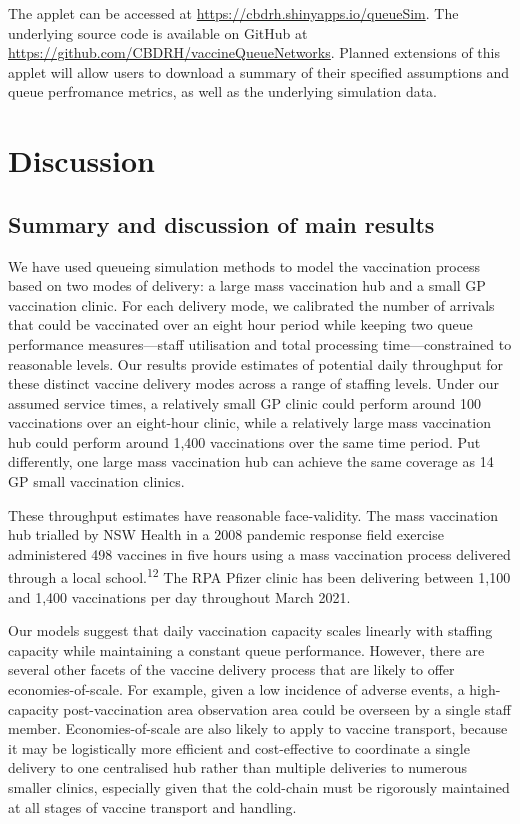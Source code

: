 \documentclass{article}
\begin{document}
The applet can be accessed at \url{https://cbdrh.shinyapps.io/queueSim}.
The underlying source code is available on GitHub at
\url{https://github.com/CBDRH/vaccineQueueNetworks}. Planned extensions
of this applet will allow users to download a summary of their specified
assumptions and queue perfromance metrics, as well as the underlying
simulation data.

\hypertarget{discussion}{%
\section{Discussion}\label{discussion}}

\hypertarget{summary-and-discussion-of-main-results}{%
\subsection{Summary and discussion of main
results}\label{summary-and-discussion-of-main-results}}

We have used queueing simulation methods to model the vaccination
process based on two modes of delivery: a large mass vaccination hub and
a small GP vaccination clinic. For each delivery mode, we calibrated the
number of arrivals that could be vaccinated over an eight hour period
while keeping two queue performance measures---staff utilisation and
total processing time---constrained to reasonable levels. Our results
provide estimates of potential daily throughput for these distinct
vaccine delivery modes across a range of staffing levels. Under our
assumed service times, a relatively small GP clinic could perform around
100 vaccinations over an eight-hour clinic, while a relatively large
mass vaccination hub could perform around 1,400 vaccinations over the
same time period. Put differently, one large mass vaccination hub can
achieve the same coverage as 14 GP small vaccination clinics.

These throughput estimates have reasonable face-validity. The mass
vaccination hub trialled by NSW Health in a 2008 pandemic response field
exercise administered 498 vaccines in five hours using a mass
vaccination process delivered through a local
school.\textsuperscript{12} The RPA Pfizer clinic has been delivering
between 1,100 and 1,400 vaccinations per day throughout March 2021.

Our models suggest that daily vaccination capacity scales linearly with
staffing capacity while maintaining a constant queue performance.
However, there are several other facets of the vaccine delivery process
that are likely to offer economies-of-scale. For example, given a low
incidence of adverse events, a high-capacity post-vaccination area
observation area could be overseen by a single staff member.
Economies-of-scale are also likely to apply to vaccine transport,
because it may be logistically more efficient and cost-effective to
coordinate a single delivery to one centralised hub rather than multiple
deliveries to numerous smaller clinics, especially given that the
cold-chain must be rigorously maintained at all stages of vaccine
transport and handling.
\end{document}
